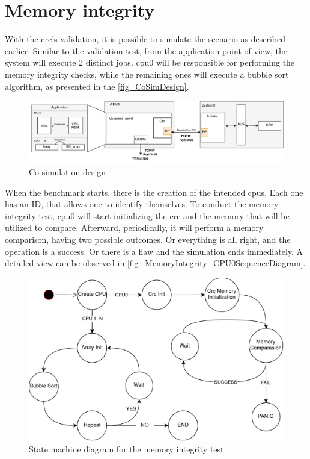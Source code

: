 \section{Memory integrity}

With the \gls*{crc}'s validation, it is possible to simulate the scenario as described earlier. Similar to the validation test, 
from the application point of view, the system will execute 2 distinct jobs. \gls{cpu}0 will be responsible for 
performing the memory integrity checks, while the remaining ones will execute a bubble sort algorithm, as presented in 
the \autoref{fig_CoSimDesign}.

\begin{figure}[H]
	\centering
 	\includegraphics[width=1\linewidth]{Images/CoSimDesign.png}
 	\caption{Co-simulation design}
	 \label{fig_CoSimDesign}
\end{figure}

When the benchmark starts, there is the creation of the intended \glspl{cpu}. Each one has an ID, that allows one to identify
themselves. To conduct the memory integrity test, \gls*{cpu}0 will start initializing the \gls*{crc} and the memory that will 
be utilized to compare. Afterward, periodically, it will perform a memory comparison, having two possible outcomes. Or everything
is all right, and the operation is a success. Or there is a flaw and the simulation ends immediately. A detailed view can be 
observed in \ref{fig_MemoryIntegrity_CPU0SequenceDiagram}. 

\begin{figure}[H]
	\centering
 	\includegraphics[width=0.7\linewidth]{Images/MemoryIntegrity_StateDiagram.png}
 	\caption{State machine diagram for the memory integrity test}
	\label{fig_MemoryIntegrity_StateDiagram}
\end{figure}

